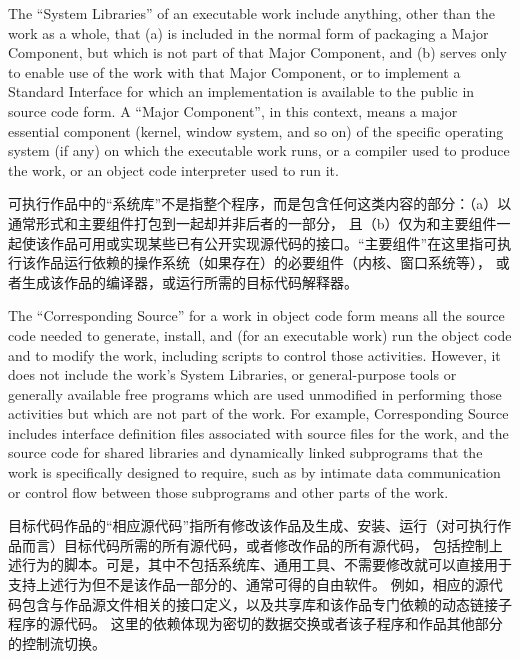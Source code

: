 \documentclass[11pt]{article}
\begin{document}
\begin{enumerate}
        The ``System Libraries'' of an executable work include anything, other
        than the work as a whole, that (a) is included in the normal form of
        packaging a Major Component, but which is not part of that Major
        Component, and (b) serves only to enable use of the work with that
        Major Component, or to implement a Standard Interface for which an
        implementation is available to the public in source code form.  A
        ``Major Component'', in this context, means a major essential component
        (kernel, window system, and so on) of the specific operating system
        (if any) on which the executable work runs, or a compiler used to
        produce the work, or an object code interpreter used to run it.

        可执行作品中的“系统库”不是指整个程序，而是包含任何这类内容的部分：（a）以通常形式和主要组件打包到一起却并非后者的一部分，
        且（b）仅为和主要组件一起使该作品可用或实现某些已有公开实现源代码的接口。“主要组件”在这里指可执行该作品运行依赖的操作系统（如果存在）的必要组件（内核、窗口系统等），
        或者生成该作品的编译器，或运行所需的目标代码解释器。

        The ``Corresponding Source'' for a work in object code form means all
        the source code needed to generate, install, and (for an executable
        work) run the object code and to modify the work, including scripts to
        control those activities.  However, it does not include the work's
        System Libraries, or general-purpose tools or generally available free
        programs which are used unmodified in performing those activities but
        which are not part of the work.  For example, Corresponding Source
        includes interface definition files associated with source files for
        the work, and the source code for shared libraries and dynamically
        linked subprograms that the work is specifically designed to require,
        such as by intimate data communication or control flow between those
        subprograms and other parts of the work.

        目标代码作品的“相应源代码”指所有修改该作品及生成、安装、运行（对可执行作品而言）目标代码所需的所有源代码，或者修改作品的所有源代码，
        包括控制上述行为的脚本。可是，其中不包括系统库、通用工具、不需要修改就可以直接用于支持上述行为但不是该作品一部分的、通常可得的自由软件。
        例如，相应的源代码包含与作品源文件相关的接口定义，以及共享库和该作品专门依赖的动态链接子程序的源代码。
        这里的依赖体现为密切的数据交换或者该子程序和作品其他部分的控制流切换。


\end{enumerate}
\end{document}
